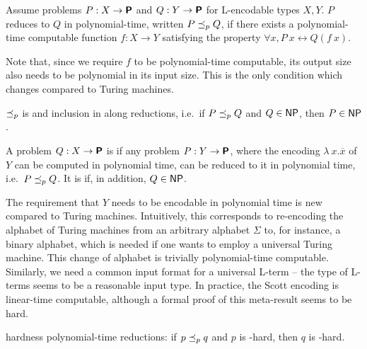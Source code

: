 \begin{definition}
  Assume problems $P : X \rightarrow \textsf{\bfseries P}$ and $Q : Y \rightarrow \textsf{\bfseries P}$ for L-encodable types $X, Y$. $P$ reduces to $Q$ in polynomial-time, written $P \preceq_p{} Q$, if there exists a polynomial-time computable function $f : X \rightarrow Y$ satisfying the property $\forall x, P~x \leftrightarrow Q(f~x)$. 
\end{definition}
Note that, since we require $f$ to be polynomial-time computable, its output size also needs to be polynomial in its input size. This is the only condition which changes compared to Turing machines.

$\preceq_p$ is  and inclusion in \NP{}  along reductions, i.e.\ if $P \preceq_p{} Q$ and $Q \in \normalfont\textsf{NP}{}$, then $P \in \textsf{NP}{}$.

\begin{definition}
  A problem $Q : X \rightarrow \textsf{\bfseries P}$ is  if any problem $P : Y \rightarrow \textsf{\bfseries P}$, where the encoding $\lambda~x. \overline{x}$ of $Y$ can be computed in polynomial time, can be reduced to it in polynomial time, i.e.\ $P \preceq_p{} Q$. It is  if, in addition, $Q \in \normalfont\textsf{NP}{}$.
\end{definition}

The requirement that $Y$ needs to be encodable in polynomial time is new compared to Turing machines. Intuitively, this corresponds to re-encoding the alphabet of Turing machines from an arbitrary alphabet $\Sigma$ to, for instance, a binary alphabet, which is needed if one wants to employ a universal Turing machine. This change of alphabet is trivially polynomial-time computable.
Similarly, we need a common input format for a universal L-term -- the type of L-terms seems to be a reasonable input type. In practice, the Scott encoding is linear-time computable, although a formal proof of this meta-result seems to be hard.

\NP{} hardness  polynomial-time reductions: if $p \preceq_p{} q$ and $p$ is \NP{}-hard, then $q$ is \NP{}-hard.

